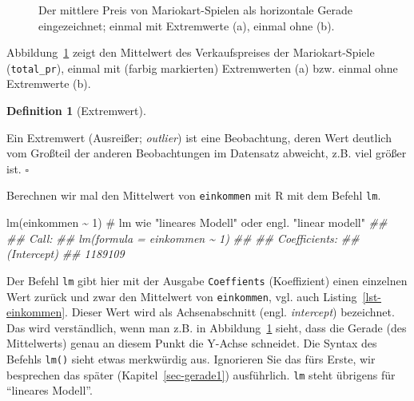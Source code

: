 \documentclass[
  letterpaper,
  twoside,
  open=any]{scrbook}
\newenvironment{Shaded}{\begin{snugshade}}{\end{snugshade}}
\newcommand{\CommentTok}[1]{\textcolor[rgb]{0.37,0.37,0.37}{#1}}
\newcommand{\DecValTok}[1]{\textcolor[rgb]{0.68,0.00,0.00}{#1}}
\newcommand{\DocumentationTok}[1]{\textcolor[rgb]{0.37,0.37,0.37}{\textit{#1}}}
\newcommand{\FunctionTok}[1]{\textcolor[rgb]{0.28,0.35,0.67}{#1}}
\newcommand{\NormalTok}[1]{\textcolor[rgb]{0.00,0.23,0.31}{#1}}
\newcommand{\SpecialCharTok}[1]{\textcolor[rgb]{0.37,0.37,0.37}{#1}}
\theoremstyle{definition}
\theoremstyle{definition}
\theoremstyle{definition}
\newtheorem{definition}{Definition}[chapter]
\theoremstyle{remark}
\begin{document}
\begin{figure}
\begin{minipage}{0.50\linewidth}
{}


\end{minipage}%

\caption{\label{fig-mw2}Der mittlere Preis von Mariokart-Spielen als
horizontale Gerade eingezeichnet; einmal mit Extremwerte (a), einmal
ohne (b).}

\end{figure}%

Abbildung~\ref{fig-mw2} zeigt den Mittelwert des Verkaufspreises der
Mariokart-Spiele (\texttt{total\_pr}), einmal mit (farbig markierten)
Extremwerten (a) bzw. einmal ohne Extremwerte (b).

\begin{definition}[Extremwert]\protect\hypertarget{def-extremwert}{}\label{def-extremwert}

Ein Extremwert (Ausreißer; \emph{outlier}) ist eine Beobachtung, deren
Wert deutlich vom Großteil der anderen Beobachtungen im Datensatz
abweicht, z.B. viel größer ist. \(\square\)

\end{definition}

Berechnen wir mal den Mittelwert von \texttt{einkommen} mit R mit dem
Befehl \texttt{lm}.

\begin{Shaded}
\begin{Highlighting}[]
\FunctionTok{lm}\NormalTok{(einkommen }\SpecialCharTok{\textasciitilde{}} \DecValTok{1}\NormalTok{)  }\CommentTok{\# lm wie "lineares Modell" oder engl. "linear modell"}
\DocumentationTok{\#\# }
\DocumentationTok{\#\# Call:}
\DocumentationTok{\#\# lm(formula = einkommen \textasciitilde{} 1)}
\DocumentationTok{\#\# }
\DocumentationTok{\#\# Coefficients:}
\DocumentationTok{\#\# (Intercept)  }
\DocumentationTok{\#\#     1189109}
\end{Highlighting}
\end{Shaded}

Der Befehl \texttt{lm} gibt hier mit der Ausgabe \texttt{Coeffients}
(Koeffizient) einen einzelnen Wert zurück und zwar den Mittelwert von
\texttt{einkommen}, vgl. auch Listing~\ref{lst-einkommen}. Dieser Wert
wird als Achsenabschnitt (engl. \emph{intercept}) bezeichnet. Das wird
verständlich, wenn man z.B. in Abbildung~\ref{fig-mw2} sieht, dass die
Gerade (des Mittelwerts) genau an diesem Punkt die Y-Achse schneidet.
Die Syntax des Befehls \texttt{lm()} sieht etwas merkwürdig aus.
Ignorieren Sie das fürs Erste, wir besprechen das später
(Kapitel~\ref{sec-gerade1}) ausführlich. \texttt{lm} steht übrigens für
\enquote{lineares Modell}.
\end{document}
